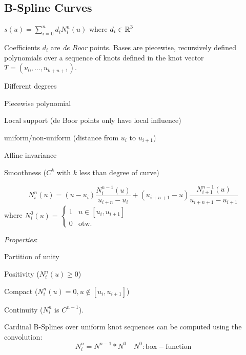 \subsection{B-Spline Curves}

\begin{center}
  \(s(u) = \sum_{i=0}^n d_i N_i^n(u)\) where \(d_i \in \operatorname{\mathbb{R}}^3\)
\end{center}

Coefficients \(d_i\) are \textit{de Boor} points. Bases are piecewise, recursively defined polynomials over a sequence of knots defined in the knot vector \(T = (u_0, \ldots, u_{k+n+1})\).

\begin{itemize*}
  \item Different degrees
  \item Piecewise polynomial
  \item Local support (de Boor points only have local influence)
  \item uniform/non-uniform (distance from \(u_i\) to \(u_{i+1}\))
  \item Affine invariance
  \item Smoothness (\(C^k\) with \(k\) less than degree of curve)
\end{itemize*}

\begin{definition}
  \[N_i^n(u) = (u - u_i)\frac{N_i^{n-1}(u)}{u_{i+n} - u_i} + (u_{i+n+1} - u)\frac{N_{i+1}^{n-1}(u)}{u_{i+n+1} - u_{i+1}}\]
  where \(N_i^0(u) = \begin{cases}
    1 & u \in [u_i, u_{i+1}] \\ 0 & \text{otw.}
  \end{cases}\)

  \textit{Properties}:
  \begin{itemize*}
    \item Partition of unity
    \item Positivity (\(N_i^n(u) \geq 0\))
    \item Compact (\(N_i^n(u) = 0, u \notin [u_i, u_{i+1}]\))
    \item Continuity (\(N_i^n\) is \(C^{n-1}\)).
  \end{itemize*}
\end{definition}

\begin{definition}
  Cardinal B-Splines over uniform knot sequences can be computed using the convolution:
  \[N_i^n = N^{n-1} \ast N^0 \quad N^0: \text{box} - \text{function}\]
\end{definition}

